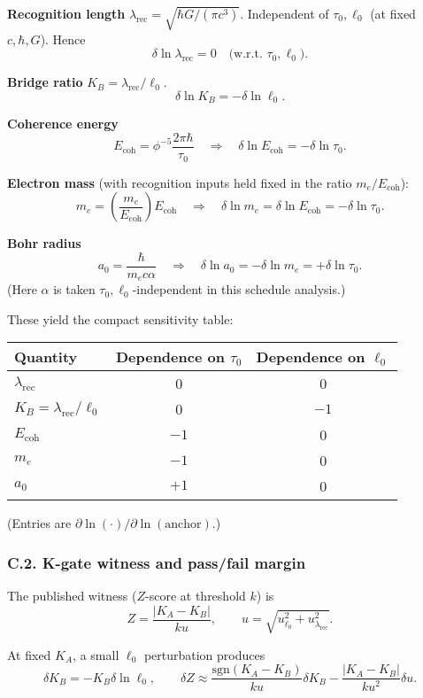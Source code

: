 \documentclass[12pt,a4paper]{article}
\theoremstyle{definition}
\theoremstyle{remark}
\begin{document}
\textbf{Recognition length} \(\lambda_{\text{rec}} = \sqrt{\hbar G/(\pi c^3)}\).
Independent of \(\tau_0, \ell_0\) (at fixed \(c, \hbar, G\)). Hence
$$\delta\ln\lambda_{\text{rec}} = 0 \quad \text{(w.r.t. } \tau_0, \ell_0\text{)}.$$

\textbf{Bridge ratio} \(K_B = \lambda_{\text{rec}}/\ell_0\).
$$\delta\ln K_B = -\delta\ln\ell_0.$$

\textbf{Coherence energy}
$$E_{\text{coh}} = \phi^{-5} \frac{2\pi\hbar}{\tau_0} \quad \Longrightarrow \quad \delta\ln E_{\text{coh}} = -\delta\ln\tau_0.$$

\textbf{Electron mass} (with recognition inputs held fixed in the ratio \(m_e/E_{\text{coh}}\)):
$$m_e = \left(\frac{m_e}{E_{\text{coh}}}\right) E_{\text{coh}} \quad \Longrightarrow \quad \delta\ln m_e = \delta\ln E_{\text{coh}} = -\delta\ln\tau_0.$$

\textbf{Bohr radius}
$$a_0 = \frac{\hbar}{m_e c \alpha} \quad \Longrightarrow \quad \delta\ln a_0 = -\delta\ln m_e = +\delta\ln\tau_0.$$
(Here \(\alpha\) is taken \(\tau_0, \ell_0\)-independent in this schedule analysis.)

These yield the compact sensitivity table:

\begin{center}
\begin{tabular}{lcc}
\hline
Quantity & Dependence on \(\tau_0\) & Dependence on \(\ell_0\) \\
\hline
\(\lambda_{\text{rec}}\) & 0 & 0 \\
\(K_B = \lambda_{\text{rec}}/\ell_0\) & 0 & \(-1\) \\
\(E_{\text{coh}}\) & \(-1\) & 0 \\
\(m_e\) & \(-1\) & 0 \\
\(a_0\) & \(+1\) & 0 \\
\hline
\end{tabular}
\end{center}

(Entries are \(\partial\ln(\cdot)/\partial\ln(\text{anchor})\).)

\subsubsection*{C.2. K-gate witness and pass/fail margin}

The published witness (\(Z\)-score at threshold \(k\)) is
$$Z = \frac{|K_A - K_B|}{ku}, \qquad u = \sqrt{u_{\ell_0}^2 + u_{\lambda_{\text{rec}}}^2}.$$

At fixed \(K_A\), a small \(\ell_0\) perturbation produces
$$\delta K_B = -K_B \delta\ln\ell_0, \qquad \delta Z \approx \frac{\text{sgn}(K_A - K_B)}{ku} \delta K_B - \frac{|K_A - K_B|}{ku^2} \delta u.$$
\end{document}
